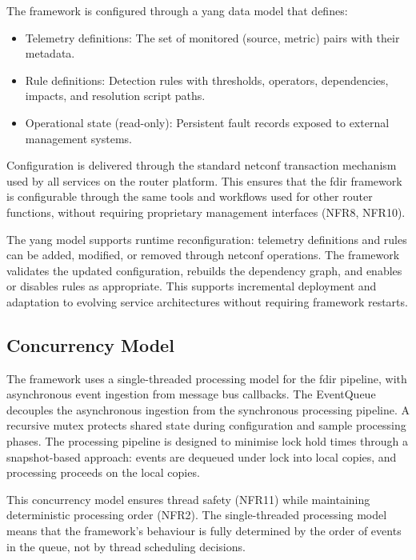 The framework is configured through a \gls{yang} data model that defines:

\begin{itemize}
\item Telemetry definitions: The set of monitored (source, metric) pairs with their metadata.
\item Rule definitions: Detection rules with thresholds, operators, dependencies, impacts, and resolution script paths.
\item Operational state (read-only): Persistent fault records exposed to external management systems.
\end{itemize}

Configuration is delivered through the standard \gls{netconf} transaction mechanism used by all services on the router platform. This ensures that the \gls{fdir} framework is configurable through the same tools and workflows used for other router functions, without requiring proprietary management interfaces (NFR8, NFR10).

The \gls{yang} model supports runtime reconfiguration: telemetry definitions and rules can be added, modified, or removed through \gls{netconf} operations. The framework validates the updated configuration, rebuilds the dependency graph, and enables or disables rules as appropriate. This supports incremental deployment and adaptation to evolving service architectures without requiring framework restarts.

\subsection{Concurrency Model}\label{sec:concurrency-model}

The framework uses a single-threaded processing model for the \gls{fdir} pipeline, with asynchronous event ingestion from message bus callbacks. The EventQueue decouples the asynchronous ingestion from the synchronous processing pipeline. A recursive mutex protects shared state during configuration and sample processing phases. The processing pipeline is designed to minimise lock hold times through a snapshot-based approach: events are dequeued under lock into local copies, and processing proceeds on the local copies.

This concurrency model ensures thread safety (NFR11) while maintaining deterministic processing order (NFR2). The single-threaded processing model means that the framework's behaviour is fully determined by the order of events in the queue, not by thread scheduling decisions.

